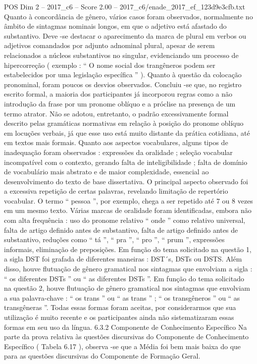 \begin{textsample}{POS Dim 2 – 2017\_c6 – Score 2.00 – 2017\_c6/enade\_2017\_ef\_123d9e3cfb.txt}
Quanto à concordância de gênero, vários casos foram observados, normalmente no âmbito de sintagmas nominais longos, em que o adjetivo está afastado do substantivo.
Deve -se destacar o aparecimento da marca de plural em verbos ou adjetivos comandados por adjunto adnominal plural, apesar de serem relacionados a núcleos substantivos no singular, evidenciando um processo de hipercorreção ( exemplo : “ O nome social dos trangêneros podem ser estabelecidos por uma legislação específica ” ).
Quanto à questão da colocação pronominal, foram poucos os desvios observados.
Concluiu -se que, no registro escrito formal, a maioria dos participantes já incorporou regras como a não introdução da frase por um pronome oblíquo e a próclise na presença de um termo atrator.
Não se adotou, entretanto, o padrão excessivamente formal descrito pelas gramáticas normativas em relação à posição do pronome oblíquo em locuções verbais, já que esse uso está muito distante da prática cotidiana, até em textos mais formais.
Quanto aos aspectos vocabulares, alguns tipos de inadequação foram observados : expressões da oralidade ; seleção vocabular incompatível com o contexto, gerando falta de inteligibilidade ; falta de domínio de vocabulário mais abstrato e de maior complexidade, essencial ao desenvolvimento do texto de base dissertativa.
O principal aspecto observado foi a excessiva repetição de certas palavras, revelando limitação de repertório vocabular.
O termo “ pessoa ”, por exemplo, chega a ser repetido até 7 ou 8 vezes em um mesmo texto.
Várias marcas de oralidade foram identificadas, embora não com alta frequência : uso do pronome relativo “ onde ” como relativo universal, falta de artigo definido antes de substantivo, falta de artigo definido antes de substantivo, reduções como “ tá ”, “ pra ”, “ pro ”, “ prum ”, expressões informais, eliminação de preposições.
Em função do tema solicitado na questão 1, a sigla DST foi grafada de diferentes maneiras : DST´s, DSTs ou DSTS.
Além disso, houve flutuação de gênero gramatical nos sintagmas que envolviam a sigla : “ os diferentes DSTs ” ou “ as diferentes DSTs ”.
Em função do tema solicitado na questão 2, houve flutuação de gênero gramatical nos sintagmas que envolviam a sua palavra-chave : “ os trans ” ou “ as trans ” ; “ os transgêneros ” ou “ as transgêneras ”.
Todas essas formas foram aceitas, por considerarmos que sua utilização é muito recente e os participantes ainda não sistematizaram essas formas em seu uso da língua. 6.3.2 Componente de Conhecimento Específico Na parte da prova relativa às questões discursivas do Componente de Conhecimento Específico ( Tabela 6.17 ), observa -se que a Média foi bem mais baixa do que para as questões discursivas do Componente de Formação Geral.

\end{textsample}
